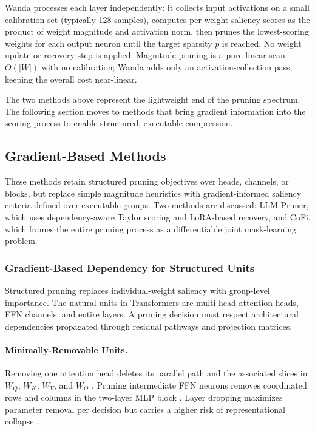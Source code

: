 Wanda processes each layer independently: it collects input activations on a small calibration set (typically 128 samples), computes per-weight saliency scores as the product of weight magnitude and activation norm, then prunes the lowest-scoring weights for each output neuron until the target sparsity $p$ is reached. No weight update or recovery step is applied. Magnitude pruning is a pure linear scan $O(|W|)$ with no calibration; Wanda adds only an activation-collection pass, keeping the overall cost near-linear.

The two methods above represent the lightweight end of the pruning spectrum. The following section moves to methods that bring gradient information into the scoring process to enable structured, executable compression.

\subsection{Gradient-Based Methods}

These methods retain structured pruning objectives over heads, channels, or blocks, but replace simple magnitude heuristics with gradient-informed saliency criteria defined over executable groups. Two methods are discussed: LLM-Pruner, which uses dependency-aware Taylor scoring and LoRA-based recovery, and CoFi, which frames the entire pruning process as a differentiable joint mask-learning problem.

\subsubsection{Gradient-Based Dependency for Structured Units}

Structured pruning replaces individual-weight saliency with group-level importance. The natural units in Transformers are multi-head attention heads, FFN channels, and entire layers. A pruning decision must respect architectural dependencies propagated through residual pathways and projection matrices.

\paragraph{Minimally-Removable Units.}
Removing one attention head deletes its parallel path and the associated slices in $W_Q$, $W_K$, $W_V$, and $W_O$ \cite{Michel2019}. Pruning intermediate FFN neurons removes coordinated rows and columns in the two-layer MLP block \cite{kurtic2022optimal}. Layer dropping maximizes parameter removal per decision but carries a higher risk of representational collapse \cite{kim2021learned}.

